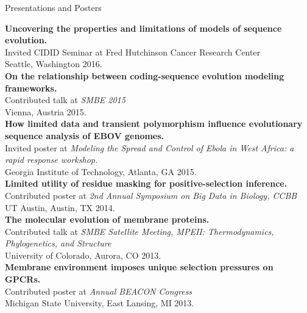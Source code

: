 \documentclass{resume} %
\begin{document}
\vspace*{0.5cm}
\begin{rSection}{Presentations and Posters}
\vspace*{0.25cm}


\textbf{Uncovering the properties and limitations of models of sequence evolution.}
\\Invited CIDID Seminar at Fred Hutchinson Cancer Research Center
\\ Seattle, Washington 2016.\\


\textbf{On the relationship between coding-sequence evolution modeling frameworks.}
\\Contributed talk at \emph{SMBE 2015}
\\ Vienna, Austria 2015.\\


\textbf{How limited data and transient polymorphism influence evolutionary sequence analysis of EBOV genomes.}
\\Invited poster at \emph{Modeling the Spread and Control of Ebola in West Africa: a rapid response workshop.}
\\ Georgia Institute of Technology, Atlanta, GA 2015.\\

\textbf{Limited utility of residue masking for positive-selection inference.}
\\Contributed poster at \emph{2nd Annual Symposium on Big Data in Biology, CCBB}
\\ UT Austin, Austin, TX 2014.\\

\textbf{The molecular evolution of membrane proteins.}
\\Contributed talk at \emph{SMBE Satellite Meeting, MPEII: Thermodynamics, Phylogenetics, and Structure}
\\ University of Colorado, Aurora, CO 2013.\\

\textbf{Membrane environment imposes unique selection pressures on GPCRs.}
\\Contributed poster at \emph{Annual BEACON Congress}
\\ Michigan State University, East Lansing, MI 2013.


\end{rSection}








\end{document}
